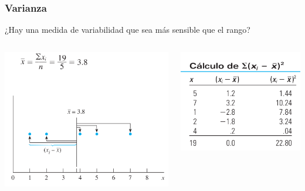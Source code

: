 \documentclass[spanish]{beamer}
\begin{document}
\begin{frame}
\frametitle{Varianza}
¿Hay una medida de variabilidad que sea más sensible que el rango?
\begin{columns}
\begin{center}
\includegraphics[width=\textwidth]{im13}
\end{center}

\begin{center}
\includegraphics[width=\textwidth]{im14}
\end{center}
\end{columns}

\end{frame}
\end{document}
